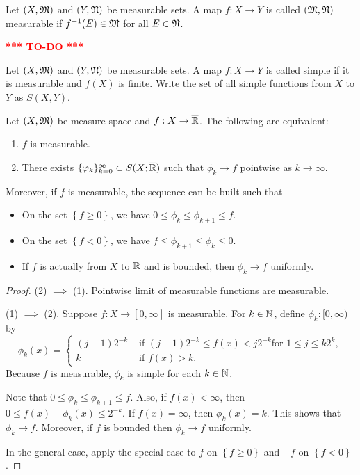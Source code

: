\documentclass[a4paper]{article}
\newcommand{\TODO}{\textcolor{red}{\textbf{*** TO-DO ***}}}
\renewcommand{\seqinfk}[1]{\{ #1 \}_{k=0}^\infty}
\begin{document}
\begin{defi}
  Let $(X, \mathfrak{M})$ and $(Y, \mathfrak{N})$ be measurable sets. A map
  $f : X \to Y$ is called $(\mathfrak{M}, \mathfrak{N})$ measurable if $f^{-1}(E)
  \in \mathfrak{M}$ for all $E \in \mathfrak{N}$.
\end{defi}

\TODO

\begin{defi}
  Let $(X, \mathfrak{M})$ and $(Y, \mathfrak{N})$ be measurable sets. A map
  $f : X \to Y$ is called simple if it is
  measurable and $f(X)$ is finite. Write the set of all
  simple functions from $X$ to $Y$ as
  $S(X, Y)$.
\end{defi}

\begin{thm}
  Let $(X, \mathfrak{M})$ be measure space and $f : X \to \overline{\mathbb{R}}$. The
  following are equivalent:
  \begin{enumerate}
    \item $f$ is measurable.
    \item There exists $\seqinfk{\phi_k} \subset S(X; \bar{\R})$ such that
    $\phi_k \to f$ pointwise as $k \to \infty$.
  \end{enumerate}
  Moreover, if $f$ is measurable, the sequence can be built such that
  \begin{itemize}
    \item On the set $\left\{ f \geq 0 \right\}$, we have
    $0 \leq \phi_k \leq \phi_{k+1} \leq f$.
    \item On the set $\left\{ f < 0 \right\}$, we have
    $f \leq \phi_{k+1} \leq \phi_k \leq 0$.
    \item If $f$ is actually from $X$ to $\mathbb{R}$ and is bounded,
    then $\phi_k \to f$ uniformly.
  \end{itemize}
\end{thm}

\begin{proof}
  (2) $\implies$ (1). Pointwise limit of measurable
  functions are measurable.

  (1) $\implies$ (2). Suppose $f : X \to [0, \infty]$
  is measurable. For $k \in \mathbb{N}$, define
  $\phi_k : [0, \infty)$ by
  \[
  \phi_k(x) = \begin{cases}
    (j - 1)2^{-k} & \text{ if
    $(j - 1)2^{-k} \leq f(x) < j 2^{-k}$
    for $1 \leq j \leq k 2^k$}, \\
    k & \text{ if $f(x) > k$}.
  \end{cases}
  \]
  Because $f$ is measurable, $\phi_k$ is simple for each
  $k \in \mathbb{N}$.

  Note that $0 \leq \phi_k \leq \phi_{k+1} \leq f$. Also,
  if $f(x) < \infty$, then $0 \leq f(x) - \phi_k(x) \leq
  2^{-k}$. If $f(x) = \infty$, then $\phi_k(x) = k$.
  This shows that $\phi_k \to f$. Moreover,
  if $f$ is bounded then $\phi_k \to f$ uniformly.

  In the general case, apply the special case to $f$ on
  $\left\{ f \geq 0 \right\}$ and $-f$ on
  $\left\{ f < 0 \right\}$.

\end{proof}
\end{document}
